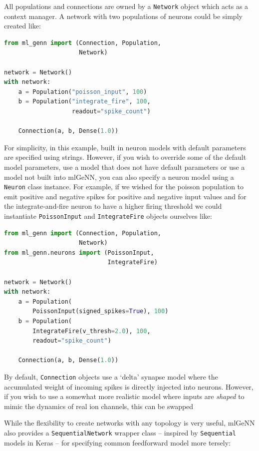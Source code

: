 \documentclass[sigconf]{acmart}
\begin{document}
All populations and connections are owned by a \lstinline{Network} object which acts as a context manager.
A network with two populations of neurons could be simply created like:

\begin{lstlisting}[language=Python]
from ml_genn import (Connection, Population,
                     Network)

network = Network()
with network:
    a = Population("poisson_input", 100)
    b = Population("integrate_fire", 100,
                   readout="spike_count")

    Connection(a, b, Dense(1.0))
\end{lstlisting}

For simplicity, in this example, built in neuron models with default parameters are specified using strings.
However, if you wish to override some of the default model parameters, use a model that does not have default parameters or use a model not built into mlGeNN, you can also specify a neuron model using a \lstinline{Neuron} class instance.
For example, if we wished for the poisson population to emit positive and negative spikes for positive and negative input values and for the integrate-and-fire 
neuron to have a higher firing threshold we could instantiate \lstinline{PoissonInput} and \lstinline{IntegrateFire} objects ourselves like:

\begin{lstlisting}[language=Python]
from ml_genn import (Connection, Population,
                     Network)
from ml_genn.neurons import (PoissonInput,
                             IntegrateFire)

network = Network()
with network:
    a = Population(
        PoissonInput(signed_spikes=True), 100)
    b = Population(
        IntegrateFire(v_thresh=2.0), 100,
        readout="spike_count")

    Connection(a, b, Dense(1.0))
\end{lstlisting}

By default, \lstinline{Connection} objects use a `delta' synapse model where the accumulated weight of incoming spikes is directly injected into neurons. 
However, if you wish to use a somewhat more realistic model where inputs are \emph{shaped} to mimic the dynamics of real ion channels, this can be swapped

While the flexibility to create networks with any topology is very useful, mlGeNN also provides a \lstinline{SequentialNetwork} wrapper class -- inspired by \lstinline{Sequential} models in Keras -- for specifying common feedforward model more tersely:
\end{document}
